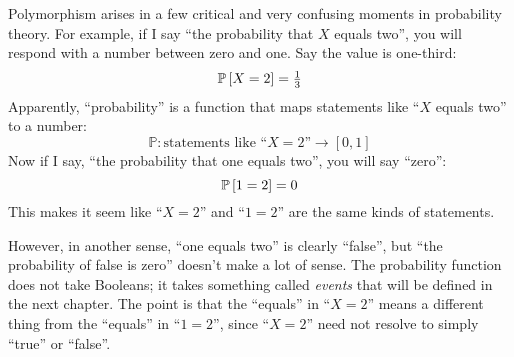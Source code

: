 Polymorphism arises in a few critical and very confusing moments in probability
theory. For example, if I say ``the probability that $X$ equals two'', you will
respond with a number between zero and one. Say the value is one-third:
\begin{equation*}
\mathbb{P}\left[{X = 2}\right] = \tfrac{1}{3}
\end{equation*}
Apparently, ``probability'' is a function that maps statements like
``$X$ equals two'' to a number:
\begin{equation*}
\mathbb{P} : \text{statements like ``$X=2$''} \to [0, 1]
\end{equation*}
Now if I say, ``the probability that one equals two'', you will say ``zero'':
\begin{equation*}
\mathbb{P}\left[{1 = 2}\right] = 0
\end{equation*}
This makes it seem like ``$X=2$'' and ``$1=2$'' are the same
kinds of statements.

However, in another sense, ``one equals two'' is clearly ``false'', but
``the probability of false is zero'' doesn't make a lot of sense. The probability
function does not take Booleans; it takes something called \emph{events} that
will be defined in the next chapter. The point is that the ``equals'' in ``$X=2$''
means a different thing from the ``equals'' in ``$1=2$'', since ``$X=2$'' need
not resolve to simply ``true'' or ``false''.
